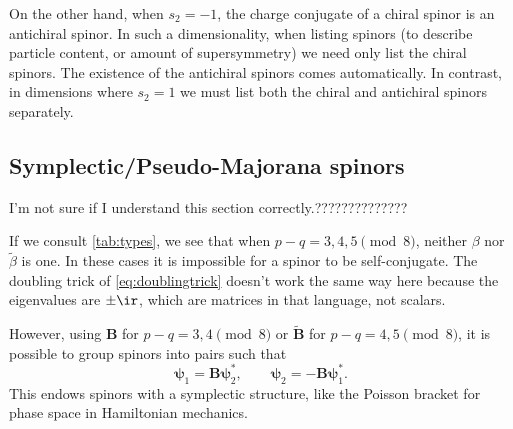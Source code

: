 \documentclass[11pt]{article}
\newcommand{\B}{\mathbf{B}}
\newcommand{\Bt}{\widetilde{\B}}
\newcommand{\psib}{\boldsymbol{\psi}}
\newcommand{\betat}{\tilde{\beta}}
\begin{document}
On the other hand, when \(s_2 = -1\), the charge conjugate of a chiral spinor is an antichiral spinor.
In such a dimensionality, when listing spinors (\eg to describe particle content, or amount of supersymmetry) we need only list the chiral spinors.
The existence of the antichiral spinors comes automatically.
In contrast, in dimensions where \(s_2 = 1\) we must list both the chiral and antichiral spinors separately.



\subsection{Symplectic/Pseudo-Majorana spinors}\label{sec:symplecticmajorana}

I'm not sure if I understand this section correctly.??????????????

If we consult \cref{tab:types}, we see that when \( p-q = 3,4,5 \pmod 8 \), neither $\beta$ nor $\betat$ is one.
In these cases it is impossible for a spinor to be self-conjugate.
The doubling trick of \cref{eq:doublingtrick} doesn't work the same way here because the eigenvalues are $\pm\ir$, which are matrices in that language, not scalars.

However, using \(\B\) for \( p-q = 3,4 \pmod 8 \) or \(\Bt\) for \( p-q = 4,5 \pmod 8 \), it is possible to group spinors into pairs such that
%
\begin{equation}\label{eq:pseudomajorana}
  \psib_1 = \B \psib_2^\ast,
  \qquad
  \psib_2 = - \B \psib_1^\ast.
\end{equation}
%
This endows spinors with a symplectic structure, like the Poisson bracket for phase space in Hamiltonian mechanics.
\end{document}
